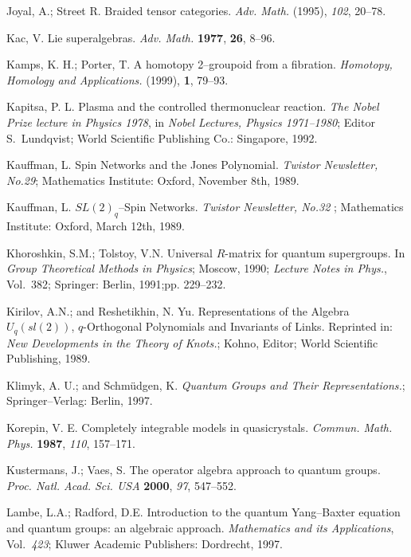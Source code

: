 \documentclass[12pt]{article}
\theoremstyle{plain}
\theoremstyle{definition}
\numberwithin{equation}{section}
\begin{document}
\begin{thebibliography}{99}
Joyal, A.; Street R. Braided tensor categories. \emph{Adv. Math.} (1995), \emph{102}, 20--78.

Kac, V. Lie superalgebras. \emph{Adv. Math.} {\bf 1977}, {\bf 26}, 8--96.

Kamps, K. H.; Porter, T. A homotopy 2--groupoid from a fibration. \emph{Homotopy, Homology and Applications.} (1999), {\bf 1}, 79--93.

Kapitsa, P. L. Plasma and the controlled thermonuclear reaction. \emph{The Nobel Prize lecture in Physics 1978}, in \emph{Nobel Lectures, Physics 1971--1980}; Editor S.~Lundqvist; World Scientific Publishing Co.: Singapore, 1992.

Kauffman, L. Spin Networks and the Jones Polynomial. \emph{Twistor Newsletter, No.29}; Mathematics Institute: Oxford, November 8th, 1989.

Kauffman, L. $SL(2)_q$--Spin Networks. \emph{Twistor Newsletter, No.32 }; Mathematics Institute: Oxford, March 12th, 1989.

Khoroshkin, S.M.; Tolstoy, V.N. Universal $R$-matrix for quantum supergroups. In {\em Group Theoretical Methods in Physics}; Moscow, 1990; {\em Lecture Notes in Phys.}, Vol.~382; Springer: Berlin, 1991;pp. 229--232.

Kirilov, A.N.; and Reshetikhin, N. Yu. Representations of the Algebra $U_q(sl(2))$, $q$-Orthogonal Polynomials and Invariants of Links. Reprinted in: {\em New Developments in the Theory of Knots.}; Kohno, Editor; World Scientific Publishing, 1989.

Klimyk, A. U.; and Schm\"udgen, K. {\em Quantum Groups and Their Representations.}; Springer--Verlag: Berlin, 1997.

Korepin, V. E. Completely integrable models in quasicrystals. {\em Commun. Math. Phys.} {\bf 1987}, {\em 110}, 157--171.

Kustermans, J.; Vaes, S. The operator algebra approach to quantum groups. {\em Proc. Natl. Acad. Sci. USA} {\bf 2000}, {\em 97}, 547--552.

Lambe, L.A.; Radford, D.E. Introduction to the quantum Yang--Baxter equation and quantum groups: an algebraic approach. \emph{Mathematics and its Applications}, Vol.~{\em 423}; Kluwer Academic Publishers: Dordrecht, 1997.


\end{thebibliography}
\end{document}
